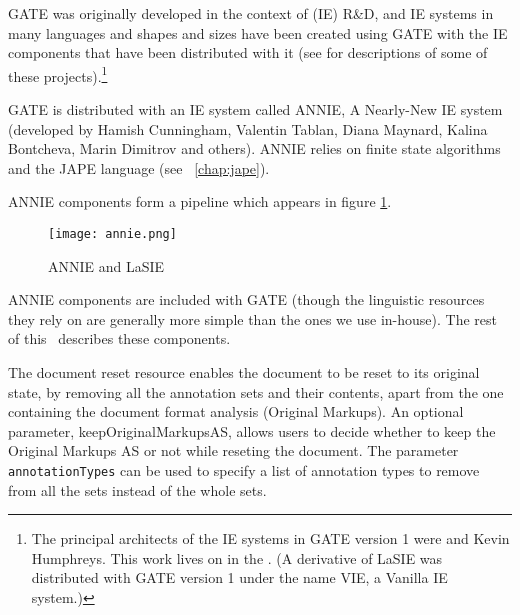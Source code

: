 %
%
%
%
\nnormalsize
%
GATE was originally developed in the context of
(IE) R\&D, and IE systems in many languages and shapes and sizes have
been created using GATE with the IE components that have been
distributed with it (see \cite{May00a} for descriptions of some of
these projects).\footnote{The principal architects of the IE systems
in GATE version 1 were
 and
Kevin Humphreys. This work lives on in the
.
(A derivative of
LaSIE was distributed with GATE version 1 under the name VIE, a Vanilla
IE system.)}

GATE is distributed with an IE system called ANNIE,
A Nearly-New IE system (developed by Hamish Cunningham,
Valentin Tablan, Diana Maynard, Kalina Bontcheva, Marin Dimitrov and
others).  ANNIE relies on finite state algorithms and the
JAPE language (see \Chapthing~\ref{chap:jape}).

ANNIE components form a pipeline which appears in figure \ref{fig:annie1}.
%
\begin{figure}[htbp]
\begin{center}
\texttt{[image: annie.png]}
\end{center}
\caption{ANNIE and LaSIE}
\label{fig:annie1}
\end{figure}
%
ANNIE components are included with GATE (though the linguistic resources they
rely on are generally more simple than the ones we use in-house). The rest of
this \chapthing\ describes these components.


The document reset resource enables the document to be reset to its
original state, by removing all the annotation sets and their
contents, apart from the one containing the document format analysis
(Original Markups). An optional parameter, keepOriginalMarkupsAS, allows users
to decide whether to keep the Original Markups AS or not while reseting the
document. The parameter \texttt{annotationTypes} can be used to specify
a list of annotation types to remove from all the sets instead of the
whole sets. 

